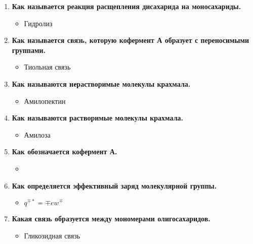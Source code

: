 \documentclass[11pt,twocolumn]{report}
\begin{document}
\begin{enumerate}
\item \textbf{Как называется реакция расщепления дисахарида на  моносахариды.}

\begin{itemize}
    \item Гидролиз
\end{itemize}
\pagebreak[2]

\item \textbf{Как называется связь, которую кофермент А образует с  переносимыми группами.}

\begin{itemize}
    \item Тиольная связь
\end{itemize}
\pagebreak[2]

\item \textbf{Как называются нерастворимые молекулы крахмала.}
\begin{itemize}
    \item Амилопектин
\end{itemize}
\pagebreak[2]

\item \textbf{Как называются растворимые молекулы крахмала.}
\begin{itemize}
    \item Амилоза
\end{itemize}
\pagebreak[2]

\item \textbf{Как обозначается кофермент А.}
\begin{itemize}
    \item
\end{itemize}
\pagebreak[2]

\item \textbf{Как определяется эффективный заряд молекулярной группы.}
\begin{itemize}
    \item $q^{\mp *} = \mp ew^{\mp}$
\end{itemize}
\pagebreak[2]

\item \textbf{Какая связь образуется между мономерами олигосахаридов.}
\begin{itemize}
    \item Гликозидная связь
\end{itemize}
\pagebreak[2]


\end{enumerate}
\end{document}
